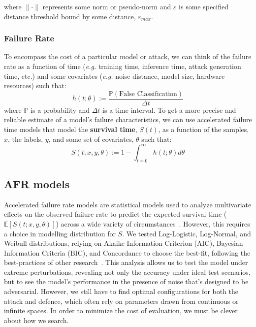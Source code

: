 \documentclass[conference]{IEEEtran}
\begin{document}
where $\| \cdot \|$ represents some norm or pseudo-norm and $\varepsilon$ is some specified distance threshold bound by some distance, $\varepsilon_{max}$.


\subsubsection{Failure Rate}
 To encompass the cost of a particular model or attack, we can think of the failure rate as a function of time (\textit{e.g.} training time, inference time, attack generation time, etc.) and some covariates (\textit{e.g.} noise distance, model size, hardware resources) such that:
\[
h(t; \theta) :=  \frac{\mathbb{P}(\textrm{False~Classification})}{\Delta t}
\]
where $\mathbb{P}$ is a probability and $\Delta t$ is a time interval. To get a more precise and reliable estimate of a model's failure characteristics, we can use accelerated failure time models that model the \textbf{survival time}, $S(t)$, as a function of the samples, $x$, the labels, $y$, and some set of covariates, $\theta$ such that:
\[
S(t; x,y, \theta) := 1 - \int_{t=0}^{\infty} h(t;\theta) d \theta
\]

\subsection{AFR models}
\label{afr}
Accelerated failure rate models are statistical models used to analyze multivariate effects on the observed failure rate to predict the expected survival time ($\mathbb{E}[S(t; x,y, \theta)]$) across a wide variety of circumstances~\cite{aft_models,kleinbaum1996survival}. However, this requires a choice in modelling distribution for $S$. We tested Log-Logistic, Log-Normal, and Weibull distributions, relying on Akaike Information Criterion (AIC), Bayesian Information Criteria (BIC), and Concordance to choose the best-fit, following the best-practices of other research~\cite{aft_models}.  This analysis allows us to test the model under extreme perturbations, revealing not only the accuracy under ideal test scenarios, but to see the model's performance in the presence of noise that's designed to be adversarial. However, we still have to find optimal configurations for both the attack and defence, which often rely on parameters drawn from continuous or infinite spaces. In order to minimize the cost of evaluation, we must be clever about how we search.
\end{document}
